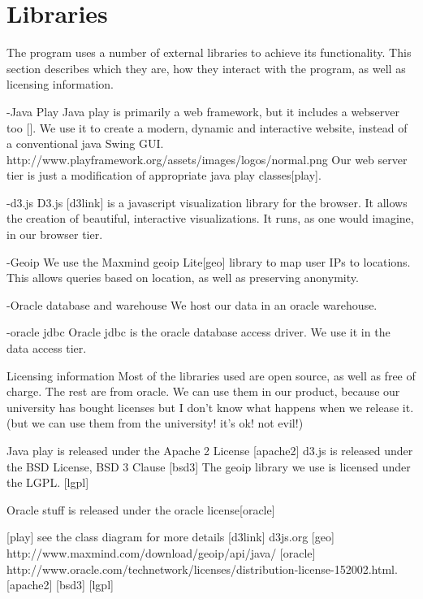 \section{Libraries}

The program uses a number of external libraries to achieve its functionality. This section describes which they are,
how they interact with the program, as well as licensing information. 

-Java Play
Java play is primarily a web framework, but it includes a webserver too [].
We use it to create a modern, dynamic and interactive website, instead of a conventional java Swing GUI.
http://www.playframework.org/assets/images/logos/normal.png
Our web server tier is just a modification of appropriate java play classes[play].

-d3.js
D3.js [d3link] is a javascript visualization library for the browser.
It allows the creation of beautiful, interactive visualizations.
It runs, as one would imagine, in our browser tier.

-Geoip
We use the Maxmind geoip Lite[geo] library to map user IPs to locations.
This allows queries based on location, as well as preserving anonymity.

-Oracle database and warehouse
We host our data in an oracle warehouse.

-oracle jdbc
Oracle jdbc is the oracle database access driver. We use it in the data access tier.



Licensing information
Most of the libraries used are open source, as well as free of charge.
The rest are from oracle. We can use them in our product, because our university has bought licenses but I don't know what happens when we release it.
(but we can use them from the university! it's ok! not evil!)

Java play is released under the Apache 2 License [apache2]
d3.js is released under the BSD License, BSD 3 Clause [bsd3]
The geoip library we use is licensed under the LGPL. [lgpl]

Oracle stuff is released under the oracle license[oracle]




[play] see the class diagram for more details
[d3link] d3js.org
[geo] http://www.maxmind.com/download/geoip/api/java/
[oracle] http://www.oracle.com/technetwork/licenses/distribution-license-152002.html.
[apache2]
[bsd3]
[lgpl]
